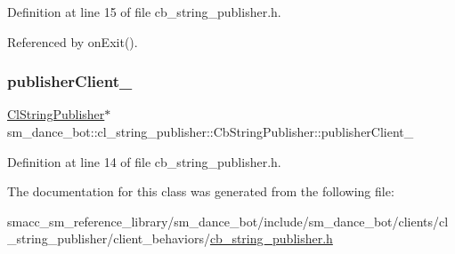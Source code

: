 Definition at line 15 of file cb\+\_\+string\+\_\+publisher.\+h.



Referenced by on\+Exit().

\mbox{\label{classsm__dance__bot_1_1cl__string__publisher_1_1CbStringPublisher_aafcad6e6296a3088cb91ffeb22025bd6}} 
\subsubsection{\texorpdfstring{publisher\+Client\+\_\+}{publisherClient\_}}
{\footnotesize\ttfamily \hyperlink{classsm__dance__bot_1_1cl__string__publisher_1_1ClStringPublisher}{Cl\+String\+Publisher}$\ast$ sm\+\_\+dance\+\_\+bot\+::cl\+\_\+string\+\_\+publisher\+::\+Cb\+String\+Publisher\+::publisher\+Client\+\_\+}



Definition at line 14 of file cb\+\_\+string\+\_\+publisher.\+h.



The documentation for this class was generated from the following file\+:\begin{DoxyCompactItemize}
\item 
smacc\+\_\+sm\+\_\+reference\+\_\+library/sm\+\_\+dance\+\_\+bot/include/sm\+\_\+dance\+\_\+bot/clients/cl\+\_\+string\+\_\+publisher/client\+\_\+behaviors/\hyperlink{include_2sm__dance__bot_2clients_2cl__string__publisher_2client__behaviors_2cb__string__publisher_8h}{cb\+\_\+string\+\_\+publisher.\+h}\end{DoxyCompactItemize}
